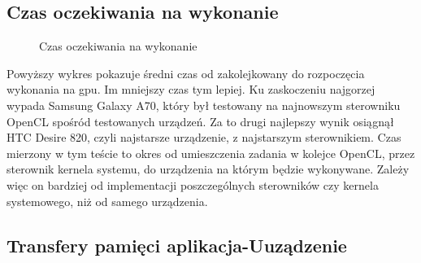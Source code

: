 \subsection[Czas oczekiwania na wykonanie]{Czas oczekiwania na wykonanie}

\begin{figure}[H]
\caption{Czas oczekiwania na wykonanie}
\end{figure}

Powyższy wykres pokazuje średni czas od zakolejkowany do rozpoczęcia wykonania na gpu. Im mniejszy czas tym lepiej. Ku zaskoczeniu najgorzej wypada Samsung Galaxy A70, który był testowany na najnowszym sterowniku OpenCL spośród testowanych urządzeń. Za to drugi najlepszy wynik osiągnął HTC Desire 820, czyli najstarsze urządzenie, z najstarszym sterownikiem. Czas mierzony w tym teście to okres od umieszczenia zadania w kolejce OpenCL, przez sterownik kernela systemu, do urządzenia na którym będzie wykonywane. Zależy więc on bardziej od implementacji poszczególnych sterowników czy kernela systemowego, niż od samego urządzenia.

\subsection[Transfery pamięci aplikacja-urządzenie]{Transfery pamięci aplikacja-Uuządzenie}

